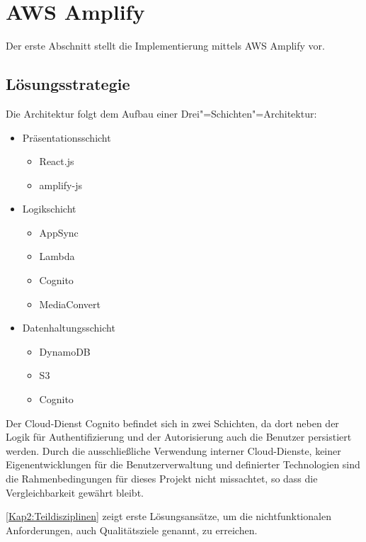 \section{AWS Amplify}

Der erste Abschnitt stellt die Implementierung mittels \ac{AWS} Amplify vor.

\subsection{Lösungsstrategie}

Die Architektur folgt dem Aufbau einer Drei"=Schichten"=Architektur:

\begin{itemize}
  \item Präsentationsschicht
    \begin{itemize}
      \item React.js
      \item amplify-js
    \end{itemize}
  \item Logikschicht
    \begin{itemize}
      \item AppSync
      \item Lambda
      \item Cognito
      \item MediaConvert
    \end{itemize}
  \item Datenhaltungsschicht
    \begin{itemize}
      \item DynamoDB
      \item S3
      \item Cognito
    \end{itemize}
\end{itemize}

Der Cloud-Dienst Cognito befindet sich in zwei Schichten, da dort neben der Logik für Authentifizierung und der Autorisierung auch die Benutzer persistiert werden. Durch die ausschließliche Verwendung interner Cloud-Dienste, keiner Eigenentwicklungen für die Benutzerverwaltung und definierter Technologien sind die Rahmenbedingungen für dieses Projekt nicht missachtet, so dass die Vergleichbarkeit gewährt bleibt.

\autoref{Kap2:Teildisziplinen} zeigt erste Lösungsansätze, um die nichtfunktionalen Anforderungen, auch Qualitätsziele genannt, zu erreichen.

